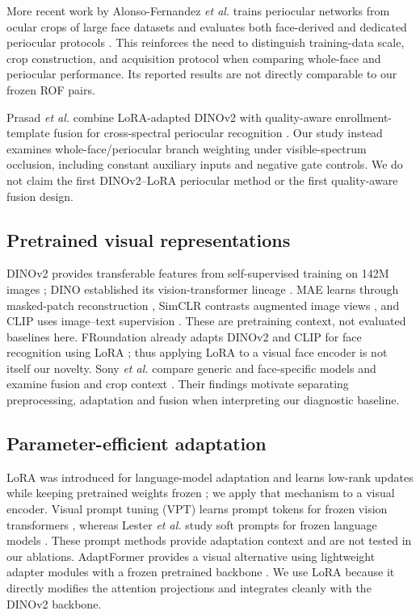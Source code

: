 \documentclass[10pt,journal,compsoc]{IEEEtran}
\begin{document}
More recent work by Alonso-Fernandez \textit{et al.} trains periocular networks from ocular crops of large face datasets and evaluates both face-derived and dedicated periocular protocols \cite{ocularcrop2025}. This reinforces the need to distinguish training-data scale, crop construction, and acquisition protocol when comparing whole-face and periocular performance. Its reported results are not directly comparable to our frozen ROF pairs.

Prasad \textit{et al.} combine LoRA-adapted DINOv2 with quality-aware enrollment-template fusion for cross-spectral periocular recognition \cite{perilora2026}. Our study instead examines whole-face/periocular branch weighting under visible-spectrum occlusion, including constant auxiliary inputs and negative gate controls. We do not claim the first DINOv2--LoRA periocular method or the first quality-aware fusion design.

\subsection{Pretrained visual representations}
DINOv2 provides transferable features from self-supervised training on 142M images \cite{dinov2}; DINO established its vision-transformer lineage \cite{dino}. MAE learns through masked-patch reconstruction \cite{mae}, SimCLR contrasts augmented image views \cite{simclr}, and CLIP uses image--text supervision \cite{clip}. These are pretraining context, not evaluated baselines here. FRoundation already adapts DINOv2 and CLIP for face recognition using LoRA \cite{froundation2025}; thus applying LoRA to a visual face encoder is not itself our novelty. Sony \textit{et al.} compare generic and face-specific models and examine fusion and crop context \cite{foundationcomparison2025}. Their findings motivate separating preprocessing, adaptation and fusion when interpreting our diagnostic baseline.

\subsection{Parameter-efficient adaptation}
LoRA was introduced for language-model adaptation and learns low-rank updates while keeping pretrained weights frozen \cite{lora}; we apply that mechanism to a visual encoder. Visual prompt tuning (VPT) learns prompt tokens for frozen vision transformers \cite{vpt}, whereas Lester \textit{et al.} study soft prompts for frozen language models \cite{prompt}. These prompt methods provide adaptation context and are not tested in our ablations. AdaptFormer provides a visual alternative using lightweight adapter modules with a frozen pretrained backbone \cite{adaptformer}. We use LoRA because it directly modifies the attention projections and integrates cleanly with the DINOv2 backbone.
\end{document}
